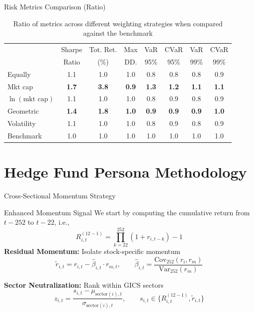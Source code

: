 \documentclass[12pt, aspectratio=43]{beamer}
\begin{document}
	\begin{frame}{Risk Metrics Comparison (Ratio)}
		\footnotesize
		\begin{table}
			\centering
			\begin{tabular}{lccccccc}
				\toprule
				& Sharpe & Tot. Ret. & Max  & VaR & CVaR & VaR  & CVaR \\
				& Ratio & (\%) & DD. &  95\% & 95\% &99\% & 99\% \\
				\midrule
				Equally & 1.1 & 1.0 & 1.0 & 0.8 & 0.8 & 0.8 & 0.9 \\
				Mkt cap & \textbf{1.7} & \textbf{3.8} & \textbf{0.9} & \textbf{1.3} & \textbf{1.2} & \textbf{1.1} & \textbf{1.1} \\
				$\ln{(\text{mkt cap})}$ & 1.1 & 1.0 & 1.0 & 0.8 & 0.9 & 0.8 & 0.9 \\
				Geometric & \textbf{1.4} & \textbf{1.8} & \textbf{1.0} & \textbf{0.9} & \textbf{0.9} & \textbf{0.9} & \textbf{1.0} \\
				Volatility & 1.1 & 1.0 & 1.0 & 0.8 & 0.9 & 0.8 & 0.9 \\
				Benchmark & 1.0 & 1.0 & 1.0 & 1.0 & 1.0 & 1.0 & 1.0 \\
				\bottomrule
			\end{tabular}
			\caption{Ratio of metrics across different weighting strategies when compared against the benchmark}
			\label{tbl:comparison_bh_weights_ratio}
		\end{table}
	\end{frame}
	

	\section{Hedge Fund Persona Methodology}
	
	\begin{frame}{Cross-Sectional Momentum Strategy}
		\vspace{-3mm}
		\small
		\begin{block}{Enhanced Momentum Signal}
			We start by computing the cumulative return from $t-252$ to $t-22$, i.e., 
			$$
			R_{i,t}^{(12-1)} = \prod_{k=22}^{252} (1 + r_{i,t-k}) - 1
			$$
			\textbf{Residual Momentum:} Isolate stock-specific momentum
			\[
			\tilde{r}_{i,t} = r_{i,t} - \hat{\beta}_{i,t} \cdot r_{m,t}, \qquad
			\hat{\beta}_{i,t} = \frac{\text{Cov}_{252}(r_i, r_m)}{\text{Var}_{252}(r_m)}
			\]
			
			\textbf{Sector Neutralization:} Rank within GICS sectors
			\[
			z_{i,t} = \frac{s_{i,t} - \mu_{\text{sector}(i),t}}{\sigma_{\text{sector}(i),t}}, \qquad s_{i,t} \in \{ R_{i,t}^{(12-1)}, \tilde{r}_{i,t} \}
			\]
		\end{block}
	\end{frame}
	
\end{document}
